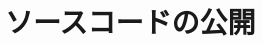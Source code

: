 \documentclass[paper=a4,fontsize=11pt,report,oneside]{jlreq}
\begin{document}




\chapter{ソースコードの公開}
\end{document}
